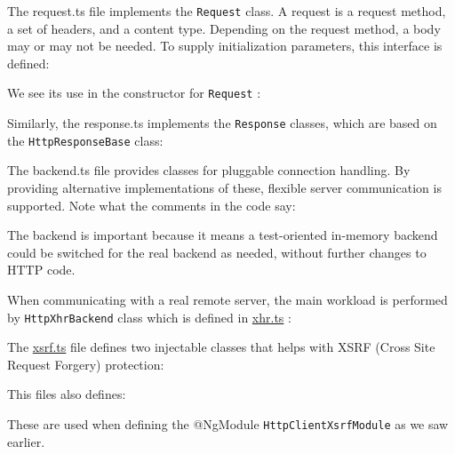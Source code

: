 The request.ts file implements the
\texttt{Request}
class. A request is a request method, a set
of headers, and a content type. Depending on the request method, a body may or
may not be needed. To supply initialization parameters, this interface is defined:



We see its use in the constructor for
\texttt{Request}
:



Similarly, the response.ts implements the
\texttt{Response}
classes, which are based on the
\texttt{HttpResponseBase}
class:



The backend.ts file provides classes for pluggable connection handling. By providing
alternative implementations of these, flexible server communication is supported.
Note what the comments in the code say:



The backend is important because it means a test-oriented in-memory backend could
be switched for the real backend as needed, without further changes to HTTP code.

When communicating with a real remote server, the main workload is performed by
\texttt{HttpXhrBackend}
class which is defined in
\url{xhr.ts}
:



The
\url{xsrf.ts}
file defines two injectable classes that helps with XSRF (Cross Site Request
Forgery) protection:



This files also defines:



These are used when defining the @NgModule
\texttt{HttpClientXsrfModule}
as we saw
earlier.
